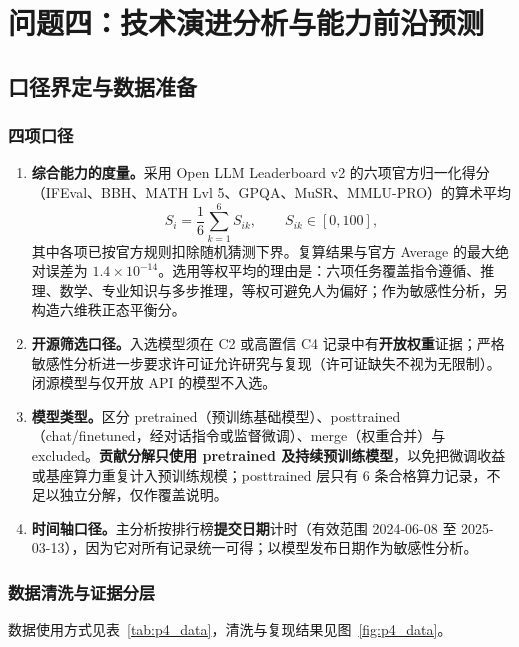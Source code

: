\section{问题四：技术演进分析与能力前沿预测}
\label{sec:problem4}

\subsection{口径界定与数据准备}

\subsubsection{四项口径}

\begin{enumerate}
\item \textbf{综合能力的度量。}采用 Open LLM Leaderboard v2\cite{fourrier2024openllm} 的六项官方归一化得分（IFEval、BBH、MATH Lvl 5、GPQA、MuSR、MMLU-PRO）的算术平均
\begin{equation}
S_i=\frac16\sum_{k=1}^{6}S_{ik},\qquad S_{ik}\in[0,100],
\label{eq:p4_S}
\end{equation}
其中各项已按官方规则扣除随机猜测下界\cite{huggingface2024normalization}。复算结果与官方 Average 的最大绝对误差为 $1.4\times10^{-14}$。选用等权平均的理由是：六项任务覆盖指令遵循、推理、数学、专业知识与多步推理，等权可避免人为偏好；作为敏感性分析，另构造六维秩正态平衡分。
\item \textbf{开源筛选口径。}入选模型须在 C2 或高置信 C4 记录中有\textbf{开放权重}证据；严格敏感性分析进一步要求许可证允许研究与复现（许可证缺失不视为无限制）。闭源模型与仅开放 API 的模型不入选。
\item \textbf{模型类型。}区分 pretrained（预训练基础模型）、posttrained（chat/finetuned，经对话指令或监督微调）、merge（权重合并）与 excluded。\textbf{贡献分解只使用 pretrained 及持续预训练模型}，以免把微调收益或基座算力重复计入预训练规模；posttrained 层只有 6 条合格算力记录，不足以独立分解，仅作覆盖说明。
\item \textbf{时间轴口径。}主分析按排行榜\textbf{提交日期}计时（有效范围 2024-06-08 至 2025-03-13），因为它对所有记录统一可得；以模型发布日期作为敏感性分析。
\end{enumerate}

\subsubsection{数据清洗与证据分层}

数据使用方式见表~\ref{tab:p4_data}，清洗与复现结果见图~\ref{fig:p4_data}。


